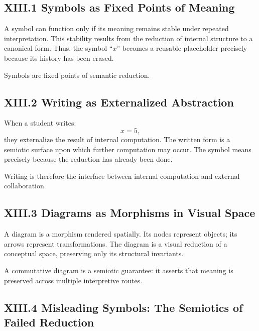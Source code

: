 \documentclass[11pt,letterpaper]{article}
\begin{document}
\subsection{XIII.1 Symbols as Fixed Points of Meaning}

A symbol can function only if its meaning remains stable under repeated interpretation. This stability results from the reduction of internal structure to a canonical form. Thus, the symbol ``\(x\)'' becomes a reusable placeholder precisely because its history has been erased.

Symbols are fixed points of semantic reduction.

\subsection{XIII.2 Writing as Externalized Abstraction}

When a student writes:
\[
x = 5,
\]
they externalize the result of internal computation. The written form is a semiotic surface upon which further computation may occur. The symbol means precisely because the reduction has already been done.

Writing is therefore the interface between internal computation and external collaboration.

\subsection{XIII.3 Diagrams as Morphisms in Visual Space}

A diagram is a morphism rendered spatially. Its nodes represent objects; its arrows represent transformations. The diagram is a visual reduction of a conceptual space, preserving only its structural invariants.

A commutative diagram is a semiotic guarantee: it asserts that meaning is preserved across multiple interpretive routes.

\subsection{XIII.4 Misleading Symbols: The Semiotics of Failed Reduction}
\end{document}
